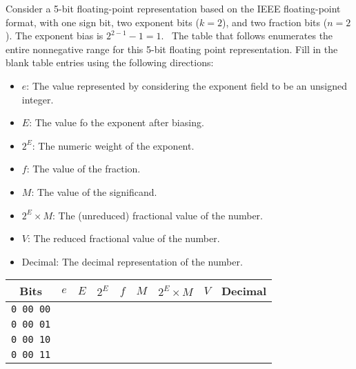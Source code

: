 \documentclass[12pt]{article}
\newenvironment{ex}[2][Exercise]{\begin{trivlist}
		\item[\hskip \labelsep {\bfseries #1}\hskip \labelsep {\bfseries #2.}]}{\end{trivlist}}
\begin{document}
\begin{ex}{2.47}
	Consider a 5-bit floating-point representation based on the IEEE floating-point
	format, with one sign bit, two exponent bits ($k=2$), and two fraction bits ($n=2$).
	The exponent bias is $2^{2-1}-1=1$.
	\
	The table that follows enumerates the entire nonnegative range for this 5-bit
	floating point representation. Fill in the blank table entries using the following
	directions:
	\begin{itemize}
		\item $e$: The value represented by  considering the exponent field to be an
		unsigned integer.
		\item $E$: The value fo the exponent after biasing.
		\item $2^E$: The numeric weight of the exponent.
		\item $f$: The value of the fraction.
		\item $M$: The value of the significand.
		\item $2^E\times M$: The (unreduced) fractional value of the number.
		\item $V$: The reduced fractional value of the number.
		\item Decimal: The decimal representation of the number.
	\end{itemize}
	\begin{center}
		\begin{tabular}{ccccccccc}
			Bits  & $e$ & $E$ & $2^E$ & $f$ & $M$ & $2^E\times M$ &  $V$ & Decimal\\
			\hline
			\texttt{0 00 00} & \makebox[1cm]{\hrulefill} & \makebox[1cm]{\hrulefill} & \makebox[1cm]{\hrulefill} & \makebox[1cm]{\hrulefill} & \makebox[1cm]{\hrulefill} & \makebox[1cm]{\hrulefill} & \makebox[1cm]{\hrulefill} & \makebox[1cm]{\hrulefill} \\
			\texttt{0 00 01} & \makebox[1cm]{\hrulefill} & \makebox[1cm]{\hrulefill} & \makebox[1cm]{\hrulefill} & \makebox[1cm]{\hrulefill} & \makebox[1cm]{\hrulefill} & \makebox[1cm]{\hrulefill} & \makebox[1cm]{\hrulefill} & \makebox[1cm]{\hrulefill} \\
			\texttt{0 00 10} & \makebox[1cm]{\hrulefill} & \makebox[1cm]{\hrulefill} & \makebox[1cm]{\hrulefill} & \makebox[1cm]{\hrulefill} & \makebox[1cm]{\hrulefill} & \makebox[1cm]{\hrulefill} & \makebox[1cm]{\hrulefill} & \makebox[1cm]{\hrulefill} \\
			\texttt{0 00 11} & \makebox[1cm]{\hrulefill} & \makebox[1cm]{\hrulefill} & \makebox[1cm]{\hrulefill} & \makebox[1cm]{\hrulefill} & \makebox[1cm]{\hrulefill} & \makebox[1cm]{\hrulefill} & \makebox[1cm]{\hrulefill} & \makebox[1cm]{\hrulefill} \\

\end{tabular}
\end{center}
\end{ex}
\end{document}
